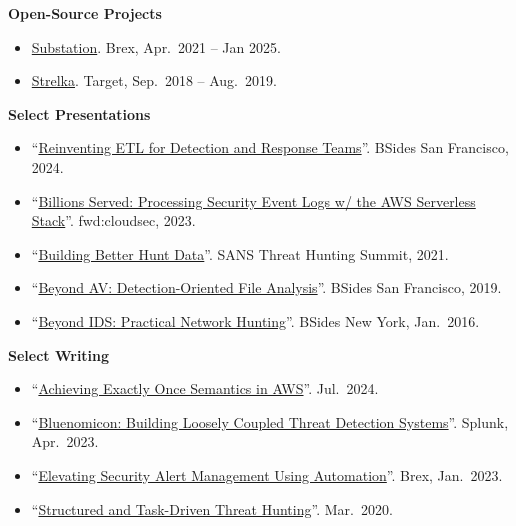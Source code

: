 \documentclass[10pt,letterpaper]{article}
\begin{document}
\textbf{Open-Source Projects}
\begin{itemize}
  \item \href{https://github.com/brexhq/substation}{Substation}. Brex, Apr.\ 2021 -- Jan 2025.
  \item \href{https://github.com/target/strelka}{Strelka}. Target, Sep.\ 2018 -- Aug.\ 2019.
\end{itemize}

\textbf{Select Presentations}
\begin{itemize}
  \item ``\href{https://www.youtube.com/watch?v=im5xfAHeiRo}{Reinventing ETL for Detection and Response Teams}''. BSides San Francisco, 2024.
  \item ``\href{https://www.youtube.com/watch?v=x2l-GCFGOcs}{Billions Served: Processing Security Event Logs w/ the AWS Serverless Stack}''. fwd:cloudsec, 2023.
  \item ``\href{https://www.youtube.com/watch?v=4A8JLV5a2Dw}{Building Better Hunt Data}''. SANS Threat Hunting Summit, 2021.
  \item ``\href{https://youtu.be/j-wjXUs8k1M}{Beyond AV: Detection-Oriented File Analysis}''. BSides San Francisco, 2019.
  \item ``\href{https://speakerdeck.com/jshlbrd/beyond-ids-practical-network-hunting}{Beyond IDS: Practical Network Hunting}''. BSides New York, Jan.\ 2016.
\end{itemize}

\textbf{Select Writing}
\begin{itemize}
  \item ``\href{https://joshliburdi.com/writing/2024_aws_exactly_once_semantics/}{Achieving Exactly Once Semantics in AWS}''. Jul.\ 2024.
  \item ``\href{https://joshliburdi.com/writing/2023_bluenomicon/}{Bluenomicon: Building Loosely Coupled Threat Detection Systems}''. Splunk, Apr.\ 2023.
  \item ``\href{https://medium.com/brexeng/elevating-security-alert-management-using-automation-828004ad596c}{Elevating Security Alert Management Using Automation}''. Brex, Jan.\ 2023.
  \item ``\href{https://joshliburdi.com/writing/2020_structured_threat_hunting/}{Structured and Task-Driven Threat Hunting}''. Mar.\ 2020.
\end{itemize}
\end{document}
